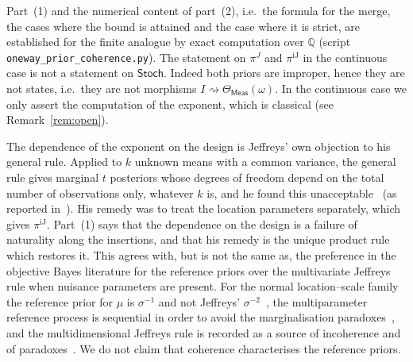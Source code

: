 \documentclass[11pt,a4paper]{article}
\theoremstyle{plain}
\theoremstyle{definition}
\theoremstyle{remark}
\newcommand{\cat}[1]{\mathsf{#1}}
\newcommand{\Meas}{\cat{Meas}}
\newcommand{\Stoch}{\cat{Stoch}}
\begin{document}
Part~(1) and the numerical content of part~(2), i.e.\ the formula for the
merge, the cases where the bound is attained and the case where it is strict,
are established for the finite analogue by exact computation over $\mathbb{Q}$
(script \texttt{oneway\_\allowbreak prior\_\allowbreak coherence.py}). The
statement on $\pi^{J}$ and $\pi^{\mathrm{iJ}}$ in the continuous case is not a
statement on $\Stoch$. Indeed both priors are improper, hence they are not
states, i.e.\ they are not morphisms
$I \rightsquigarrow \Theta_\Meas(\omega)$. In the continuous case we only
assert the computation of the exponent, which is classical (see
Remark~\ref{rem:open}).

The dependence of the exponent on the design is Jeffreys' own objection to his
general rule. Applied to $k$ unknown means with a common variance, the general
rule gives marginal $t$ posteriors whose degrees of freedom depend on the total
number of observations only, whatever $k$ is, and he found this
unacceptable~\cite[p.~182]{jeffreys_theory_1961} (as reported
in~\cite[p.~1345]{kass_selection_1996}). His remedy was to treat the location
parameters separately, which gives $\pi^{\mathrm{iJ}}$. Part~(1) says that the
dependence on the design is a failure of naturality along the insertions, and
that his remedy is the unique product rule which restores it. This agrees
with, but is not the same as, the preference in the objective Bayes literature
for the reference priors over the multivariate Jeffreys rule when nuisance
parameters are present. For the normal location--scale family the reference
prior for $\mu$ is $\sigma^{-1}$ and not Jeffreys'
$\sigma^{-2}$~\cite[p.~119]{bernardo_reference_1979}, the multiparameter
reference process is sequential in order to avoid the marginalisation
paradoxes~\cite[pp.~905--906]{berger_formal_2009}, and the multidimensional
Jeffreys rule is recorded as a source of incoherence and of
paradoxes~\cite[p.~631]{consonni_prior_2018}. We do not claim that coherence
characterises the reference priors.
\end{document}

